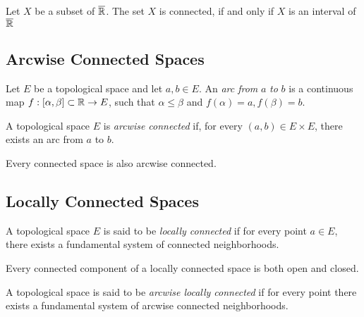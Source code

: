 \begin{theorem}
	Let $X$ be a subset of $\overline {\mathbb{R}}$. The set $X$ is connected, if and only if $X$ is an interval of $\overline {\mathbb{R}}$	
\end{theorem}

\subsection{Arcwise Connected Spaces}

\begin{definition}
	Let $E$ be a topological space and let $a,b \in E$. An \emph{arc from} $a$ \emph{to} $b$ is a continuous map $f : [ \alpha , \beta] \subset \mathbb{R} \to E$, such that $\alpha \leq \beta$ and $f(\alpha) = a, f(\beta) = b$. 
\end{definition}

\begin{definition}
	A topological space $E$ is \emph{arcwise connected} if, for every $(a,b) \in E \times E$, there exists an arc from $a$ to $b$.	
\end{definition}

\begin{theorem}
Every connected space is also arcwise connected.	
\end{theorem}

\subsection{Locally Connected Spaces}

\begin{definition}
	A topological space $E$ is said to be \emph{locally connected} if for every point $a \in E$, there exists a fundamental system of connected neighborhoods.
\end{definition}

\begin{theorem}
	Every connected component of a locally connected space is both open and closed.
\end{theorem}

\begin{definition}
	A topological space is said to be \emph{arcwise locally connected} if for every point there exists a fundamental system of arcwise connected neighborhoods.
\end{definition}
